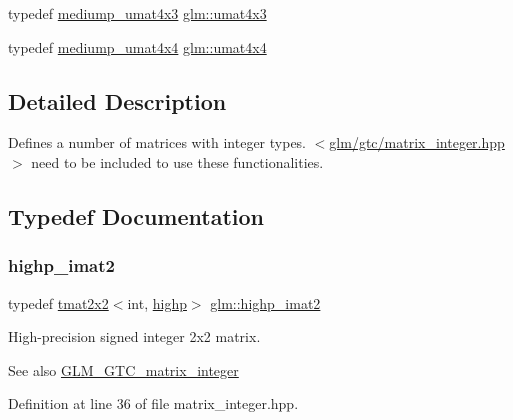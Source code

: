 \begin{DoxyCompactItemize}
\item 
typedef \mbox{\hyperlink{group__gtc__matrix__integer_gac91ed5aa76fe160d5ab5d31e2b94d95b}{mediump\+\_\+umat4x3}} \mbox{\hyperlink{group__gtc__matrix__integer_ga08373f5588a54da1a48e5e55c7d51004}{glm\+::umat4x3}}
\item 
typedef \mbox{\hyperlink{group__gtc__matrix__integer_ga7141a9d9f1c26521e397be34d19c1b8f}{mediump\+\_\+umat4x4}} \mbox{\hyperlink{group__gtc__matrix__integer_gae0931b79e808fb0983848778a60eb548}{glm\+::umat4x4}}
\end{DoxyCompactItemize}


\subsection{Detailed Description}
Defines a number of matrices with integer types. $<$\mbox{\hyperlink{matrix__integer_8hpp}{glm/gtc/matrix\+\_\+integer.\+hpp}}$>$ need to be included to use these functionalities. 

\subsection{Typedef Documentation}
\mbox{\label{group__gtc__matrix__integer_gae1cd6ff099593d2f215bd4ceed538200}} 
\subsubsection{\texorpdfstring{highp\_imat2}{highp\_imat2}}
{\footnotesize\ttfamily typedef \mbox{\hyperlink{structglm_1_1tmat2x2}{tmat2x2}}$<$int, \mbox{\hyperlink{namespaceglm_a0f04f086094c747d227af4425893f545ac6f7eab42eacbb10d59a58e95e362074}{highp}}$>$ \mbox{\hyperlink{group__gtc__matrix__integer_gae1cd6ff099593d2f215bd4ceed538200}{glm\+::highp\+\_\+imat2}}}

High-\/precision signed integer 2x2 matrix. \begin{DoxySeeAlso}{See also}
\mbox{\hyperlink{group__gtc__matrix__integer}{G\+L\+M\+\_\+\+G\+T\+C\+\_\+matrix\+\_\+integer}} 
\end{DoxySeeAlso}


Definition at line 36 of file matrix\+\_\+integer.\+hpp.

\mbox{\label{group__gtc__matrix__integer_gab4411f2d106d24a32aaa3cb711dc8510}} 
